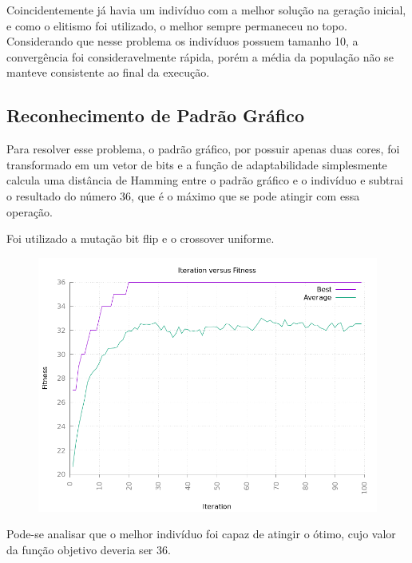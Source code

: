 \documentclass[12pt]{article}
\begin{document}
Coincidentemente já havia um indivíduo com a melhor solução na geração inicial, e como o elitismo 
foi utilizado, o melhor sempre permaneceu no topo. Considerando que nesse problema os indivíduos 
possuem tamanho 10, a convergência foi consideravelmente rápida, porém a média da população não 
se manteve consistente ao final da execução.

\subsection{Reconhecimento de Padrão Gráfico}

Para resolver esse problema, o padrão gráfico, por possuir apenas duas cores, foi transformado em um 
vetor de bits e a função de adaptabilidade simplesmente calcula uma distância de Hamming entre o 
padrão gráfico e o indivíduo e subtrai o resultado do número 36, que é o máximo que se pode 
atingir com essa operação.

Foi utilizado a mutação bit flip e o crossover uniforme.

\begin{figure}[h!]
    \centering
    \includegraphics[width=.5\textwidth]{pictures/pattern-rec}
\end{figure}

Pode-se analisar que o melhor indivíduo foi capaz de atingir o ótimo, cujo valor da função objetivo 
deveria ser 36.



\end{document}
